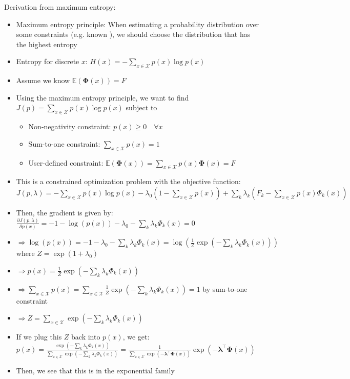 Derivation from maximum entropy:
\begin{itemize}
    \item Maximum entropy principle: When estimating a probability distribution over some constraints (e.g. known ), we should choose the distribution that has the highest entropy
    \item Entropy for discrete $x$:
    $
    H(x) = -\sum_{x \in \mathcal{X}} p(x) \log p(x)
    $
    \item Assume we know $\mathbb{E}(\boldsymbol{\Phi}(x)) = F$
    \item Using the maximum entropy principle, we want to find $J(p) = \sum_{x \in \mathcal{X}} p(x) \log p(x)$ subject to
    \begin{itemize}
        \item Non-negativity constraint: $p(x) \geq 0 \quad \forall x$
        \item Sum-to-one constraint: $\sum_{x \in \mathcal{X}} p(x) = 1$
        \item User-defined constraint: $\mathbb{E}(\boldsymbol{\Phi}(x)) = \sum_{x \in \mathcal{X}} p(x) \boldsymbol{\Phi}(x) = F$
    \end{itemize}
    \item This is a constrained optimization problem with the objective function: $
    J(p, \lambda) = -\sum_{x \in \mathcal{X}} p(x) \log p(x) - \lambda_0 \left(1 - \sum_{x \in \mathcal{X}} p(x)\right) + \sum_k \lambda_k \left(F_k - \sum_{x \in \mathcal{X}} p(x) \Phi_k(x)\right)
    $
    \item Then, the gradient is given by:
    $
    \frac{\partial J(p, \lambda)}{\partial p(x)} = -1 - \log(p(x)) - \lambda_0 - \sum_k \lambda_k \Phi_k(x) = 0
    $
    \item $\Rightarrow \log(p(x)) = -1 - \lambda_0 - \sum_k \lambda_k \Phi_k(x) = \log(\frac{1}{Z} \exp\left(-\sum_k \lambda_k \Phi_k(x)\right))$ where $Z = \exp(1 + \lambda_0)$
    \item $\Rightarrow p(x) = \frac{1}{Z} \exp\left(-\sum_k \lambda_k \Phi_k(x)\right)$
    \item $\Rightarrow
    \sum_{x \in \mathcal{X}} p(x) = \sum_{x \in \mathcal{X}} \frac{1}{Z} \exp\left(-\sum_k \lambda_k \Phi_k(x)\right) = 1
    $ by sum-to-one constraint
    \item $\Rightarrow
    Z = \sum_{x \in \mathcal{X}} \exp\left(-\sum_k \lambda_k \Phi_k(x)\right)$
    \item If we plug this $Z$ back into $p(x)$, we get:
    $
    p(x) = \frac{\exp\left(-\sum_k \lambda_k \Phi_k(x)\right)}{\sum_{x \in \mathcal{X}} \exp\left(-\sum_k \lambda_k \Phi_k(x)\right)} = \frac{1}{\sum_{x \in \mathcal{X}} \exp\left(-\boldsymbol{\lambda}^\intercal \boldsymbol{\Phi}(x)\right)} \exp\left(-\boldsymbol{\lambda}^\intercal \boldsymbol{\Phi}(x)\right)
    $
    \item Then, we see that this is in the exponential family
\end{itemize}
